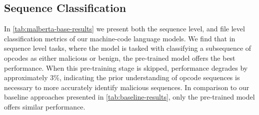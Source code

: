 \documentclass[conference,compsoc]{IEEEtran}
\begin{document}
\subsection{Sequence Classification}


\noindent
In \ref{tab:malberta-base-results} we present both the sequence level, and file level classification metrics of our machine-code language models. We find that in sequence level tasks, where the model is tasked with classifying a subsequence of opcodes as either malicious or benign, the pre-trained model offers the best performance. When this pre-training stage is skipped, performance degrades by approximately 3\%, indicating the prior understanding of opcode sequences is necessary to more accurately identify malicious sequences. In comparison to our baseline approaches presented in \ref{tab:baseline-results}, only the pre-trained model offers similar performance. 
\end{document}
